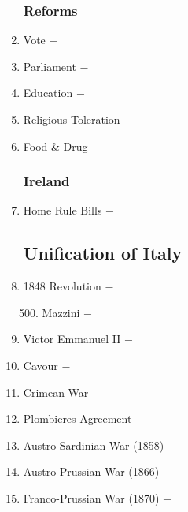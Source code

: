 \documentclass[12pt]{article}
\begin{document}
\begin{enumerate}
\begin{enumerate}[label=\arabic{*}.]
\end{enumerate}
\setcounter{enumi}{492}

\subsubsection{Reforms}

\item Vote $-$ 

\item Parliament $-$ 

\item Education $-$ 

\item Religious Toleration $-$ 

\item Food \& Drug $-$ 

\subsubsection{Ireland}

\item Home Rule Bills $-$ 

\subsection{Unification of Italy}

\item 1848 Revolution $-$ 

\begin{enumerate}[label=\arabic{*}.]
\setcounter{enumii}{499}

\item Mazzini $-$ 

\end{enumerate}
\setcounter{enumi}{500}

\item Victor Emmanuel II $-$

\item Cavour $-$ 

\item Crimean War $-$ 

\item Plombieres Agreement $-$ 

\item Austro-Sardinian War (1858) $-$ 

\item Austro-Prussian War (1866) $-$ 

\item Franco-Prussian War (1870) $-$ 


\end{enumerate}
\end{document}
